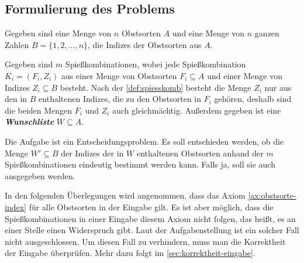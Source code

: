 \subsection{Formulierung des Problems}\label{sec:formulierung}
Gegeben sind eine Menge von $n$ Obstsorten $A$ und eine Menge von $n$ ganzen Zahlen
$B = \{1, 2, ..., n\}$, die Indizes der Obstsorten aus $A$.





Gegeben sind $m$ Spießkombinationen, wobei jede Spießkombination $K_i = (F_i, Z_i)$
aus einer Menge von Obstsorten $F_i \subseteq A$ und einer Menge von Indizes $Z_i \subseteq B$ besteht. 
Nach der \cref{def:spiesskomb} besteht die Menge $Z_i$ nur aus
den in $B$ enthaltenen Indizes, die zu den Obstsorten in $F_i$ gehören, deshalb sind die beiden Mengen
$F_i$ und $Z_i$ auch gleichmächtig. Außerdem gegeben ist eine \textit{\textbf{Wunschliste}} $W \subseteq A$.

Die Aufgabe ist ein Entscheidungsproblem. Es soll entschieden werden,
ob die Menge $W' \subseteq B$ der Indizes der in $W$ enthaltenen Obstsorten anhand der $m$ 
Spießkombinationen eindeutig bestimmt werden kann. Falls ja, soll sie auch ausgegeben werden.

In den folgenden Überlegungen wird angenommen, dass das Axiom \ref{ax:obstsorte-index} für alle
Obstsorten in der Eingabe gilt.
Es ist aber möglich, dass die Spießkombinationen in einer Eingabe diesem Axiom nicht folgen, das heißt,
es an einer Stelle einen Widerspruch gibt.
Laut der Aufgabenstellung ist ein solcher Fall nicht ausgeschlossen. 
Um diesen Fall zu verhindern, muss man die Korrektheit der Eingabe überprüfen. 
Mehr dazu folgt im \cref{sec:korrektheit-eingabe}.
